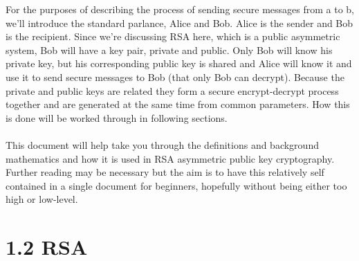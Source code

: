 \documentclass[11pt]{article}   	%
\begin{document}
For the purposes of describing the process of sending secure messages from a to b, we'll introduce the standard parlance, Alice and Bob. Alice is the sender and Bob is the recipient. Since we're discussing RSA here, which is a public asymmetric system, Bob will have a key pair, private and public. Only Bob will know his private key, but his corresponding public key is shared and Alice will know it and use it to send secure messages to Bob (that only Bob can decrypt). Because the private and public keys are related they form a secure encrypt-decrypt process together and are generated at the same time from common parameters. How this is done will be worked through in following sections. \\
\\
This document will help take you through the definitions and background mathematics and how it is used in RSA asymmetric public key cryptography. Further reading may be necessary but the aim is to have this relatively self contained in a single document for beginners, hopefully without being either too high or low-level.


\section*{1.2 RSA}
\end{document}
